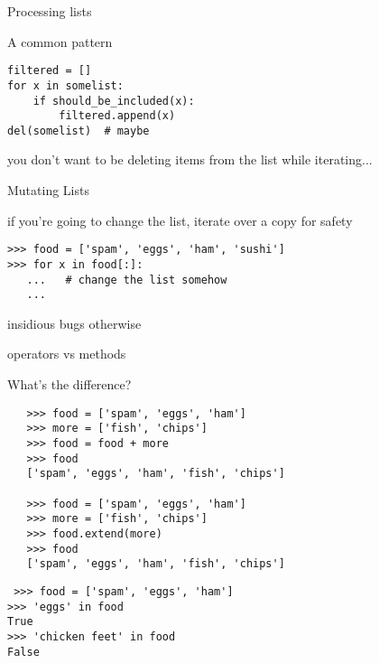 \documentclass{beamer}
\begin{document}
\begin{frame}[fragile]{Processing lists}

{\Large A common pattern}

\begin{verbatim}
filtered = []
for x in somelist:
    if should_be_included(x):
        filtered.append(x)
del(somelist)  # maybe
\end{verbatim}

{\Large you don't want to be deleting items from the list while iterating...}

\end{frame} 

\begin{frame}[fragile]{Mutating Lists}

{\Large if you’re going to change the list, iterate over a copy for safety }

\begin{verbatim}
>>> food = ['spam', 'eggs', 'ham', 'sushi']
>>> for x in food[:]:
   ...   # change the list somehow
   ...
\end{verbatim}

{\Large insidious bugs otherwise}

\end{frame} 

\begin{frame}[fragile]{operators vs methods}

{\large What's the difference?}

\begin{verbatim}
   >>> food = ['spam', 'eggs', 'ham']
   >>> more = ['fish', 'chips']
   >>> food = food + more
   >>> food
   ['spam', 'eggs', 'ham', 'fish', 'chips']

   >>> food = ['spam', 'eggs', 'ham']
   >>> more = ['fish', 'chips']
   >>> food.extend(more)
   >>> food
   ['spam', 'eggs', 'ham', 'fish', 'chips']
\end{verbatim}

\end{frame} 

\begin{frame}[fragile]{in}

\begin{verbatim}
￼>>> food = ['spam', 'eggs', 'ham']
>>> 'eggs' in food
True
>>> 'chicken feet' in food
False
\end{verbatim}

\end{frame} 
\end{document}
